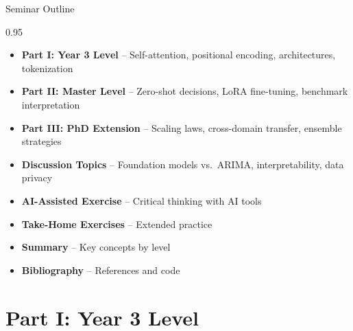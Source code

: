 \documentclass[9pt, aspectratio=169, t]{beamer}
\subtitle{Seminar 11: LLMs and Foundation Models for Time Series}
\begin{document}
{
\begin{frame}
    \titlepage
\end{frame}
}

\begin{frame}{Seminar Outline}
    \begin{cminipage}{0.95\textwidth}
    \begin{itemize}
        \item \textbf{Part I: Year 3 Level} -- Self-attention, positional encoding, architectures, tokenization
        \vspace{0.15cm}
        \item \textbf{Part II: Master Level} -- Zero-shot decisions, LoRA fine-tuning, benchmark interpretation
        \vspace{0.15cm}
        \item \textbf{Part III: PhD Extension} -- Scaling laws, cross-domain transfer, ensemble strategies
        \vspace{0.15cm}
        \item \textbf{Discussion Topics} -- Foundation models vs.\ ARIMA, interpretability, data privacy
        \vspace{0.15cm}
        \item \textbf{AI-Assisted Exercise} -- Critical thinking with AI tools
        \vspace{0.15cm}
        \item \textbf{Take-Home Exercises} -- Extended practice
        \vspace{0.15cm}
        \item \textbf{Summary} -- Key concepts by level
        \vspace{0.15cm}
        \item \textbf{Bibliography} -- References and code
    \end{itemize}
    \end{cminipage}
\end{frame}

\section{Part I: Year 3 Level}
\end{document}
